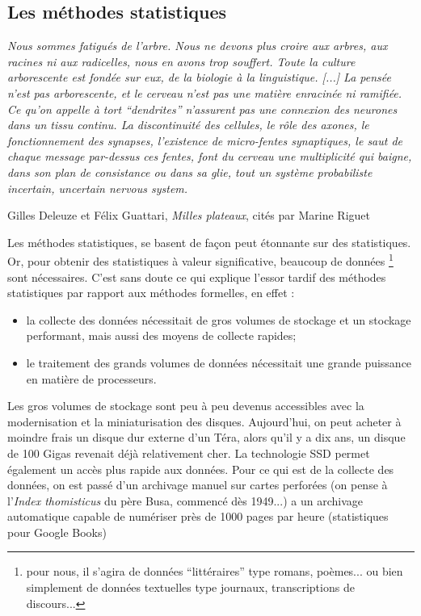 \documentclass{article}
\newenvironment{citationbox}
{\begin{center}
		\begin{minipage}{.8\textwidth}
		}
		{
		\end{minipage}	
\end{center}
}
\begin{document}
			
		\subsection{Les méthodes statistiques}\label{methodes_stat}
			\begin{citationbox}
				\textit{Nous sommes fatigués de l'arbre. Nous ne devons plus croire aux arbres, aux racines ni aux radicelles, nous en avons trop souffert. Toute la culture arborescente est fondée sur eux, de la biologie à la linguistique. [...] La pensée n'est pas arborescente, et le cerveau n'est pas une matière enracinée ni ramifiée. Ce qu'on appelle à tort  ``dendrites'' n'assurent pas une connexion des neurones dans un tissu continu. La discontinuité des cellules, le rôle des axones, le fonctionnement des synapses, l'existence de micro-fentes synaptiques, le saut de chaque message par-dessus ces fentes, font du cerveau une multiplicité qui baigne, dans son plan de consistance ou dans sa glie, tout un système probabiliste incertain, uncertain nervous system.}
				\begin{flushright}
					Gilles Deleuze et Félix Guattari, \textit{Milles plateaux}, cités par Marine Riguet \cite{riguet2017}
				\end{flushright}
			\end{citationbox} 
			Les méthodes statistiques, se basent de façon peut étonnante sur des statistiques. Or, pour obtenir des statistiques à valeur significative, beaucoup de données \footnote{pour nous, il s'agira de données ``littéraires'' type romans, poèmes... ou bien simplement de données textuelles type journaux, transcriptions de discours...} sont nécessaires. C'est sans doute ce qui explique l'essor tardif des méthodes statistiques par rapport aux méthodes formelles, en effet :
			\vspace{2mm}
			\begin{itemize}
				\item la collecte des données nécessitait de gros volumes de stockage et un stockage performant, mais aussi des moyens de collecte rapides;
				\item le traitement des grands volumes de données nécessitait une grande puissance en matière de processeurs.
			\end{itemize}
			\vspace{2mm}
			Les gros volumes de stockage sont peu à peu devenus accessibles avec la modernisation et la miniaturisation des disques. Aujourd'hui, on peut acheter à moindre frais un disque dur externe d'un Téra, alors qu'il y a dix ans, un disque de 100 Gigas revenait déjà relativement cher. La technologie SSD permet également un accès plus rapide aux données. Pour ce qui est de la collecte des données, on est passé d'un archivage manuel sur cartes perforées (on pense à l'\textit{Index thomisticus} du père Busa, commencé dès 1949...) a un archivage automatique capable de numériser près de 1000 pages par heure (statistiques pour Google Books)\\
			
\end{document}
